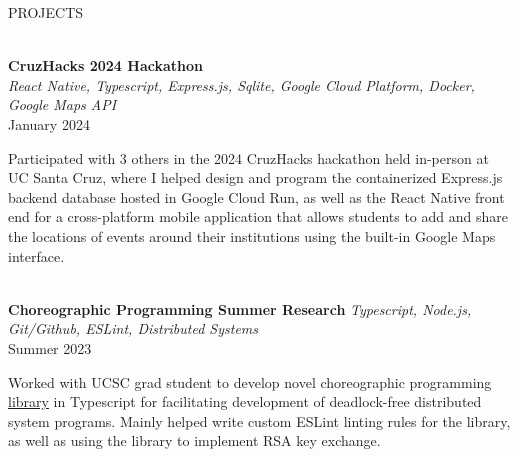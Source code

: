 \documentclass[letterpaper,10pt]{article}
\begin{document}
\begin{multicols*}{2}
  \begin{LARGE} \faTools\hspace{5px} PROJECTS \end{LARGE}
  \vspace{.5em} \\
  {
  \fontsize{11pt}{\baselineskip}\selectfont
  \textbf{CruzHacks 2024 Hackathon}
  }
  \\
  \textit{React Native, Typescript, Express.js, Sqlite, Google Cloud Platform, Docker, Google Maps API} \\
  January 2024
  \vspace{5px} \\
  \begin{minipage}{.5\textwidth}
    \begin{flushleft}
      Participated with 3 others in the 2024 CruzHacks hackathon held in-person at UC Santa Cruz, where I helped design and program the containerized Express.js backend database hosted in Google Cloud Run, as well as the React Native front end for a cross-platform mobile application that allows students to add and share the locations of events around their institutions using the built-in Google Maps interface.
    \end{flushleft}
  \end{minipage}
  \vspace{.5em} \\
  {
  \fontsize{10.5pt}{\baselineskip}\selectfont
  \textbf{Choreographic Programming Summer Research}
  }
  \textit{Typescript, Node.js, Git/Github, ESLint, Distributed Systems} \\
  Summer 2023
  \vspace{5px} \\
  \begin{minipage}{.5\textwidth}
    \begin{flushleft}
      Worked with UCSC grad student to develop novel choreographic programming \href{https://github.com/ImpregnableProgrammer/choreography-ts-RK-work}{library} in Typescript for facilitating development of deadlock-free distributed system programs. Mainly helped write custom ESLint linting rules for the library, as well as using the library to implement RSA key exchange.
    \end{flushleft}
  \end{minipage}
  \columnbreak \\
  \vspace{1em} \\

\end{multicols*}
\end{document}
